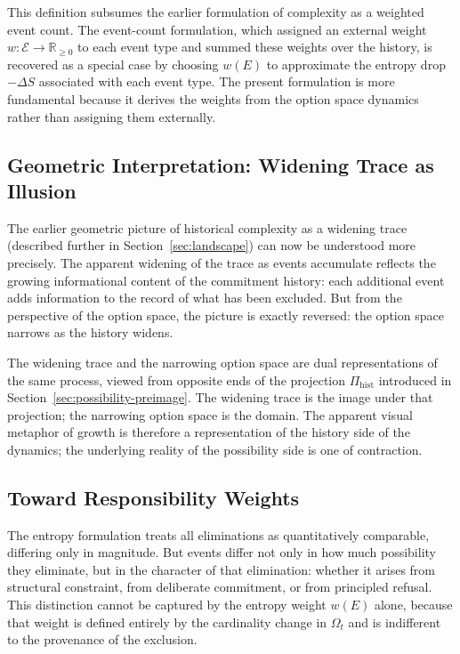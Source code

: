 \documentclass[12pt]{article}
\theoremstyle{plain}
\theoremstyle{definition}
\theoremstyle{remark}
\begin{document}
This definition subsumes the earlier formulation of complexity as a weighted
event count.  The event-count formulation, which assigned an external weight
$w : \mathcal{E} \to \mathbb{R}_{\geq 0}$ to each event type and summed these
weights over the history, is recovered as a special case by choosing $w(E)$ to
approximate the entropy drop $-\Delta S$ associated with each event type.  The
present formulation is more fundamental because it derives the weights from the
option space dynamics rather than assigning them externally.

\subsection{Geometric Interpretation: Widening Trace as Illusion}

The earlier geometric picture of historical complexity as a widening trace
(described further in Section~\ref{sec:landscape}) can now be understood more
precisely.  The apparent widening of the trace as events accumulate reflects
the growing informational content of the commitment history: each additional
event adds information to the record of what has been excluded.  But from the
perspective of the option space, the picture is exactly reversed: the option
space narrows as the history widens.

The widening trace and the narrowing option space are dual representations of
the same process, viewed from opposite ends of the projection $\Pi_{\mathrm{hist}}$
introduced in Section~\ref{sec:possibility-preimage}.  The widening trace is
the image under that projection; the narrowing option space is the domain.  The
apparent visual metaphor of growth is therefore a representation of the history
side of the dynamics; the underlying reality of the possibility side is one of
contraction.

\subsection{Toward Responsibility Weights}

The entropy formulation treats all eliminations as quantitatively comparable,
differing only in magnitude.  But events differ not only in how much possibility
they eliminate, but in the character of that elimination: whether it arises from
structural constraint, from deliberate commitment, or from principled refusal.
This distinction cannot be captured by the entropy weight $w(E)$ alone, because
that weight is defined entirely by the cardinality change in $\Omega_t$ and is
indifferent to the provenance of the exclusion.
\end{document}
